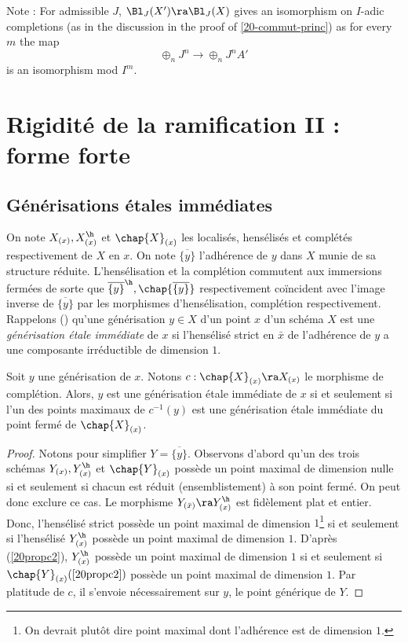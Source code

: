 \documentclass[10pt]{../fichiers-configuration-latex/smfart}
\begin{document}
Note : For admissible $J$, $\Bl_J(X') \ra
\Bl_J(X)$ gives an isomorphism on $I$-adic
completions (as in the discussion in the proof of
\ref{20-commut-princ}) as for every $m$ the map $$ \oplus_n
J^n \to \oplus_n J^nA' $$ is an isomorphism mod $I^m$.



\section{Rigidité de la ramification II : forme forte}

\subsection{Générisations étales immédiates} On note $X_{(x)},X^\h_{(x)}$ et $\chap{X}_{(x)}$ les
localisés, hensélisés et complétés respectivement de $X$ en $x$. On note $\overline{\{y\}}$
l'adhérence de $y$ dans $X$ munie de sa structure réduite. L'hensélisation et la complétion
commutent aux immersions fermées de sorte que $\overline{\{y\}}^\h,\chap{\overline{\{y\}}}$
respectivement coïncident avec l'image inverse de $\overline{\{y\}}$ par les morphismes
d'hensélisation, complétion respectivement.  Rappelons
() qu'une générisation $y\in X$ d'un point $x$
d'un schéma $X$ est une \textit{générisation étale immédiate} de $x$ si l'hensélisé strict en $\bar
x$ de l'adhérence de $y$ a une composante irréductible de dimension $1$.






\begin{lemme2}\label{20et-imm} Soit $y$ une générisation de $x$. Notons $c:\chap{X}_{(x)}\ra
X_{(x)}$ le morphisme de complétion. Alors, $y$ est une générisation étale immédiate de $x$ si et
seulement si l'un des points maximaux de $c^{-1}(y)$ est une générisation étale immédiate du point
fermé de $\chap{X}_{(x)}$.\end{lemme2}

 \begin{proof} Notons pour simplifier $Y=\overline{\{y\}}$. Observons d'abord qu'un des trois
schémas $Y_{(x)},Y^\h_{(x)}$ et $\chap{Y}_{(x)}$ possède un point maximal de dimension nulle si et
seulement si chacun est réduit (ensemblistement) à son point fermé. On peut donc exclure ce cas. Le
morphisme $Y_{(\bar x)}\ra Y^\h_{(x)}$ est fidèlement plat et entier. Donc,  l'hensélisé strict
possède un point maximal de dimension $1$\footnote{On devrait plutôt dire point maximal dont
l'adhérence est de dimension $1$.} si et seulement si l'hensélisé $Y^\h_{(x)}$ possède un point
maximal de dimension $1$. D'après (\ref{20propc2}), $Y^\h_{(x)}$ possède un point maximal de
dimension $1$ si et seulement si $\chap{Y}_{(x)}(\ref{20propc2})$ possède un point maximal de
dimension $1$. Par platitude de $c$, il s'envoie nécessairement sur $y$, le point générique de
$Y$.\end{proof}
\end{document}
